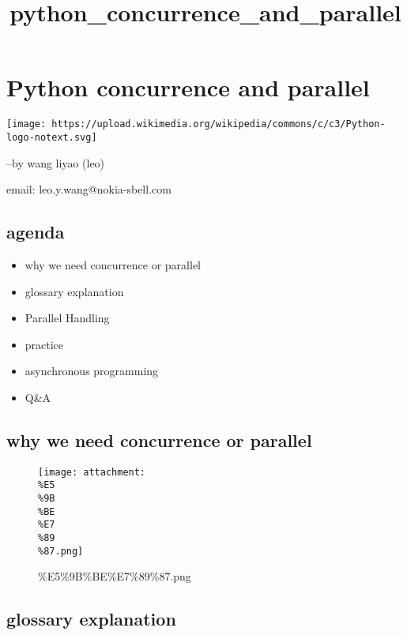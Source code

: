 \documentclass[11pt]{article}
\title{python\_concurrence\_and\_parallel}
\makeatletter
\def\maxwidth{\ifdim\Gin@nat@width>\linewidth\linewidth
    \else\Gin@nat@width\fi}
\let\Oldincludegraphics\includegraphics
\renewcommand{\includegraphics}[1]{\Oldincludegraphics[width=.8\maxwidth]{#1}}
\providecommand{\tightlist}{%
      \setlength{\itemsep}{0pt}\setlength{\parskip}{0pt}}
\makeatother
\begin{document}
    
    
    \maketitle
    
    

    
    \hypertarget{python-concurrence-and-parallel}{%
\section{Python concurrence and
parallel}\label{python-concurrence-and-parallel}}

\texttt{[image: https://upload.wikimedia.org/wikipedia/commons/c/c3/Python-logo-notext.svg]}

--by wang liyao (leo)

email: leo.y.wang@nokia-sbell.com

    \hypertarget{agenda}{%
\subsection{agenda}\label{agenda}}

\begin{itemize}
\tightlist
\item
  why we need concurrence or parallel
\item
  glossary explanation
\item
  Parallel Handling
\item
  practice
\item
  asynchronous programming
\item
  Q\&A
\end{itemize}

    \hypertarget{why-we-need-concurrence-or-parallel}{%
\subsection{why we need concurrence or
parallel}\label{why-we-need-concurrence-or-parallel}}

    \begin{figure}
\centering
\texttt{[image: attachment:\\\%E5\\\%9B\\\%BE\\\%E7\\\%89\\\%87.png]}
\caption{\%E5\%9B\%BE\%E7\%89\%87.png}
\end{figure}

    \hypertarget{glossary-explanation}{%
\subsection{glossary explanation}\label{glossary-explanation}}
\end{document}
